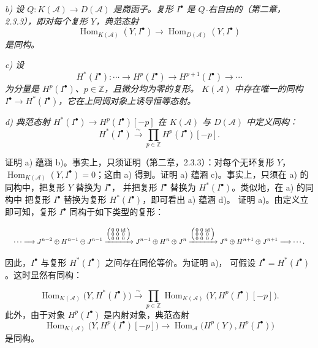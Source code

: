 \clearpage
{}%
\begingroup\small\setlength{\parskip}{0pt}\setlength{\emergencystretch}{1.5em}
\setlength{\abovedisplayskip}{4pt plus 2pt minus 2pt}%
\setlength{\belowdisplayskip}{4pt plus 2pt minus 2pt}%

\noindent\textit{b) 设
$Q\colon K(\mathcal A)\longrightarrow D(\mathcal A)$ 是商函子。复形
$I^\bullet$ 是 $Q$-右自由的（第二章，2.3.3），即对每个复形 $Y$，典范态射}
\[
\operatorname{Hom}_{K(\mathcal A)}(Y,I^\bullet)
\longrightarrow\operatorname{Hom}_{D(\mathcal A)}(Y,I^\bullet)
\]
\textit{是同构。}

\noindent\textit{c) 设}
\[
H^*(I^\bullet)\colon\cdots\longrightarrow H^p(I^\bullet)
\longrightarrow H^{p+1}(I^\bullet)\longrightarrow\cdots
\]
\textit{为分量是 $H^p(I^\bullet)$、$p\in\mathbb Z$，且微分均为零的复形。
$K(\mathcal A)$ 中存在唯一的同构
$I^\bullet\longrightarrow H^*(I^\bullet)$，它在上同调对象上诱导恒等态射。}

\noindent\textit{d) 典范态射
$H^*(I^\bullet)\longrightarrow H^p(I^\bullet)[-p]$ 在 $K(\mathcal A)$ 与
$D(\mathcal A)$ 中定义同构：}
\[
H^*(I^\bullet)\xrightarrow{\sim}
\prod_{p\in\mathbb Z}H^p(I^\bullet)[-p].
\]

证明 a) 蕴涵 b)。事实上，只须证明（第二章，2.3.3）：对每个无环复形 $Y$，
$\operatorname{Hom}_{K(\mathcal A)}(Y,I^\bullet)=0$；这由 a) 得到。证明 a)
蕴涵 c)。事实上，只须在 a) 的同构中，把复形 $Y$ 替换为 $I^\bullet$，
并把复形 $I^\bullet$ 替换为 $H^*(I^\bullet)$。类似地，在 a) 的同构中
把复形 $I^\bullet$ 替换为复形 $H^*(I^\bullet)$，即可看出 a) 蕴涵 d)。
证明 a)。由定义立即可知，复形 $I^\bullet$ 同构于如下类型的复形：

\[
\resizebox{0.98\linewidth}{!}{$
\displaystyle
\cdots\longrightarrow
J^{n-2}\oplus H^{n-1}\oplus J^{n-1}
\xrightarrow{\left(\begin{smallmatrix}
0&0&\mathrm{id}\\0&0&0\\0&0&0
\end{smallmatrix}\right)}
J^{n-1}\oplus H^n\oplus J^n
\xrightarrow{\left(\begin{smallmatrix}
0&0&\mathrm{id}\\0&0&0\\0&0&0
\end{smallmatrix}\right)}
J^n\oplus H^{n+1}\oplus J^{n+1}
\longrightarrow\cdots
$}.
\]

因此，$I^\bullet$ 与复形 $H^*(I^\bullet)$ 之间存在同伦等价。为证明 a)，
可假设 $I^\bullet=H^*(I^\bullet)$。这时显然有同构：

\[
\operatorname{Hom}_{K(\mathcal A)}\bigl(Y,H^*(I^\bullet)\bigr)
\xrightarrow{\sim}
\prod_{p\in\mathbb Z}
\operatorname{Hom}_{K(\mathcal A)}
\bigl(Y,H^p(I^\bullet)[-p]\bigr).
\]
此外，由于对象 $H^p(I^\bullet)$ 是内射对象，典范态射
\[
\operatorname{Hom}_{K(\mathcal A)}
\bigl(Y,H^p(I^\bullet)[-p]\bigr)
\longrightarrow
\operatorname{Hom}_{\mathcal A}\bigl(H^p(Y),H^p(I^\bullet)\bigr)
\]
是同构。
\endgroup
